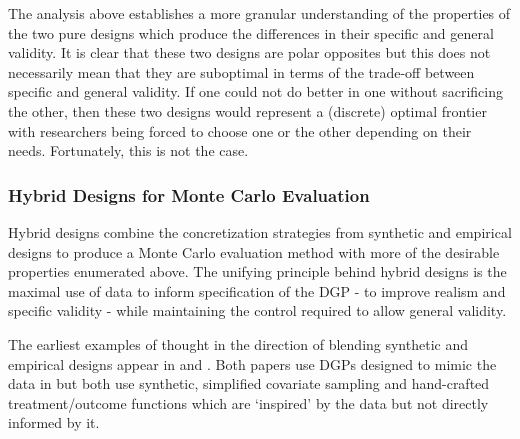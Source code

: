 \documentclass[../main.tex]{subfiles}
\begin{document}
The analysis above establishes a more granular understanding of the properties of the two pure designs which produce the differences in their specific and general validity. It is clear that these two designs are polar opposites but this does not necessarily mean that they are suboptimal in terms of the trade-off between specific and general validity. If one could not do better in one without sacrificing the other, then these two designs would represent a (discrete) optimal frontier with researchers being forced to choose one or the other depending on their needs. Fortunately, this is not the case.

\subsubsection{Hybrid Designs for Monte Carlo Evaluation}

Hybrid designs combine the concretization strategies from synthetic and empirical designs to produce a Monte Carlo evaluation method with more of the desirable properties enumerated above. The unifying principle behind hybrid designs is the maximal use of data to inform specification of the DGP - to improve realism and specific validity - while maintaining the control required to allow general validity.\par


\vspace{\baselineskip}
The earliest examples of thought in the direction of blending synthetic and empirical designs appear in \cite{Abadie2002LargeEffects} and \cite{Diamond2012GeneticStudies}. Both papers use DGPs designed to mimic the data in \cite{Lalonde1986EvaluatingData} but both use synthetic, simplified covariate sampling and hand-crafted treatment/outcome functions which are ‘inspired’ by the data but not directly informed by it.\par
\end{document}
